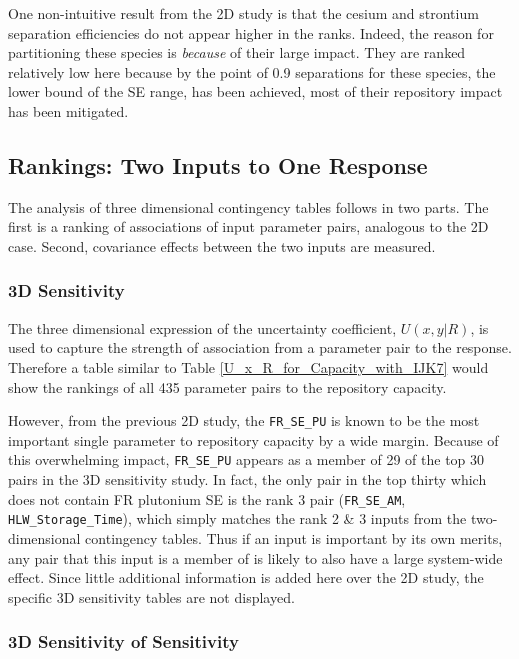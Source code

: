 \documentclass[a4paper, 12pt]{article}
\begin{document}
One non-intuitive result from the 2D study is that the cesium and strontium separation efficiencies do not appear higher in the ranks.  Indeed, the reason for
partitioning these species is \emph{because} of their large impact.  They are ranked relatively low here 
because by the point of 0.9 separations for these species,
the lower bound of the SE range, has been achieved, most of their repository impact has been mitigated.

\subsection{Rankings: Two Inputs to One Response}
\label{sec:rank3D}

The analysis of three dimensional contingency tables follows in two parts.  The first is a ranking of associations of input parameter pairs, analogous to
the 2D case.  Second, covariance effects between the two inputs are measured.

\subsubsection{3D Sensitivity}
\label{sec:3D_sensitivity}

%
The three dimensional expression of the uncertainty coefficient, $U(x,y|R)$, is used to capture the strength of association from a parameter pair to the response.
Therefore a table similar to Table \ref{U_x_R_for_Capacity_with_IJK7} would show the rankings of all 435 parameter pairs
to the repository capacity.

However, from the previous 2D study, the \texttt{FR\_SE\_PU}
is known to be the most important single parameter to repository capacity by a wide margin.  Because of this overwhelming impact, \texttt{FR\_SE\_PU} appears as a member of
29 of the top 30 pairs in the 3D sensitivity study.  In fact, the only pair in the top thirty which does not contain FR plutonium SE is the rank 3 pair
(\texttt{FR\_SE\_AM}, \texttt{HLW\_Storage\_Time}), which simply matches the rank 2 \& 3 inputs from the two-dimensional contingency tables.
Thus if an input is important by its own merits, any pair that this input is a member of is likely to also have a large system-wide effect.
Since little additional information is added here over the 2D study, the specific 3D sensitivity tables are not displayed.

\subsubsection{3D Sensitivity of Sensitivity}
\label{sec:3D_sensitivity_of_sensitivity}
\end{document}
